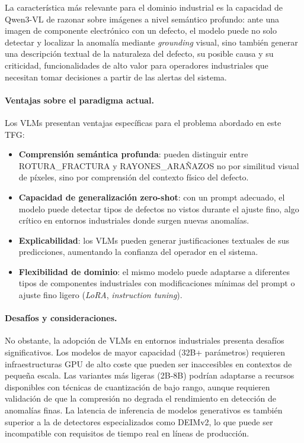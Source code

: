 La característica más relevante para el dominio industrial es la capacidad de Qwen3-VL de razonar sobre imágenes a nivel semántico profundo: ante una imagen de componente electrónico con un defecto, el modelo puede no solo detectar y localizar la anomalía mediante \textit{grounding} visual, sino también generar una descripción textual de la naturaleza del defecto, su posible causa y su criticidad, funcionalidades de alto valor para operadores industriales que necesitan tomar decisiones a partir de las alertas del sistema.

\paragraph{Ventajas sobre el paradigma actual.}

Los VLMs presentan ventajas específicas para el problema abordado en este TFG:

\begin{itemize}
    \item \textbf{Comprensión semántica profunda}: pueden distinguir entre \mbox{ROTURA\_FRACTURA} y \mbox{RAYONES\_ARAÑAZOS} no por similitud visual de píxeles, sino por comprensión del contexto físico del defecto.
    \item \textbf{Capacidad de generalización zero-shot}: con un prompt adecuado, el modelo puede detectar tipos de defectos no vistos durante el ajuste fino, algo crítico en entornos industriales donde surgen nuevas anomalías.
    \item \textbf{Explicabilidad}: los VLMs pueden generar justificaciones textuales de sus predicciones, aumentando la confianza del operador en el sistema.
    \item \textbf{Flexibilidad de dominio}: el mismo modelo puede adaptarse a diferentes tipos de componentes industriales con modificaciones mínimas del prompt o ajuste fino ligero (\textit{LoRA}, \textit{instruction tuning}).
\end{itemize}

\paragraph{Desafíos y consideraciones.}

No obstante, la adopción de VLMs en entornos industriales presenta desafíos significativos. Los modelos de mayor capacidad (32B+ parámetros) requieren infraestructuras GPU de alto coste que pueden ser inaccesibles en contextos de pequeña escala. Las variantes más ligeras (2B-8B) podrían adaptarse a recursos disponibles con técnicas de cuantización de bajo rango, aunque requieren validación de que la compresión no degrada el rendimiento en detección de anomalías finas. La latencia de inferencia de modelos generativos es también superior a la de detectores especializados como DEIMv2, lo que puede ser incompatible con requisitos de tiempo real en líneas de producción.

